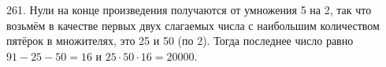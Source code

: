 261. Нули на конце произведения получаются от умножения 5 на 2, так что возьмём в качестве первых двух слагаемых числа с наибольшим количеством пятёрок в множителях, это 25 и 50 (по 2). Тогда последнее число равно $91-25-50=16$ и $25\cdot50\cdot16=20000.$\\
